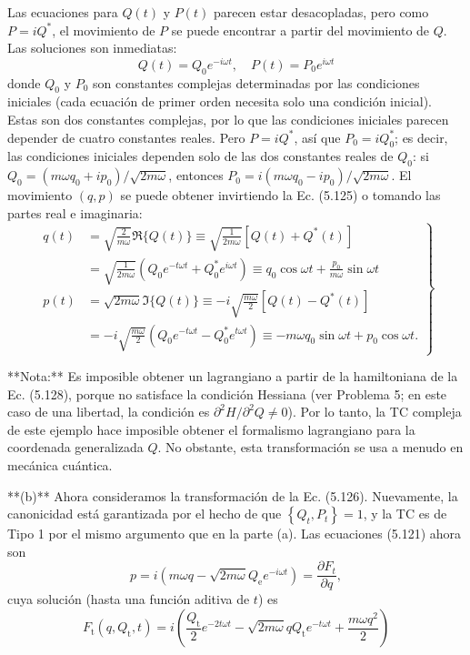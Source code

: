 \begin{example}
Las ecuaciones para $Q(t)$ y $P(t)$ parecen estar desacopladas, pero como $P=i Q^{*}$, el movimiento de $P$ se puede encontrar a partir del movimiento de $Q$. Las soluciones son inmediatas:  
$$
Q(t)=Q_{0} e^{-i \omega t}, \quad P(t)=P_{0} e^{i \omega t} \tag{5.129}
$$  
donde $Q_{0}$ y $P_{0}$ son constantes complejas determinadas por las condiciones iniciales (cada ecuación de primer orden necesita solo una condición inicial). Estas son dos constantes complejas, por lo que las condiciones iniciales parecen depender de cuatro constantes reales. Pero $P=i Q^{*}$, así que $P_{0}=i Q_{0}^{*}$; es decir, las condiciones iniciales dependen solo de las dos constantes reales de $Q_{0}$: si $Q_{0}=\left(m \omega q_{0}+i p_{0}\right) / \sqrt{2 m \omega}$, entonces $P_{0}=i\left(m \omega q_{0}-i p_{0}\right) / \sqrt{2 m \omega}$. El movimiento $(q, p)$ se puede obtener invirtiendo la Ec. (5.125) o tomando las partes real e imaginaria:  
$$
\left.\begin{array}{rl}
q(t) & =\sqrt{\frac{2}{m \omega}} \mathfrak{R}\{Q(t)\} \equiv \sqrt{\frac{1}{2 m \omega}}\left[Q(t)+Q^{*}(t)\right] \\
& =\sqrt{\frac{1}{2 m \omega}}\left(Q_{0} e^{-t \omega t}+Q_{0}^{*} e^{i \omega t}\right) \equiv q_{0} \cos \omega t+\frac{p_{0}}{m \omega} \sin \omega t  \tag{5.130}\\
p(t) & =\sqrt{2 m \omega} \Im\{Q(t)\} \equiv-i \sqrt{\frac{m \omega}{2}}\left[Q(t)-Q^{*}(t)\right] \\
& =-i \sqrt{\frac{m \omega}{2}}\left(Q_{0} e^{-t \omega t}-Q_{0}^{*} e^{t \omega t}\right) \equiv-m \omega q_{0} \sin \omega t+p_{0} \cos \omega t.
\end{array}\right\}
$$  

**Nota:** Es imposible obtener un lagrangiano a partir de la hamiltoniana de la Ec. (5.128), porque no satisface la condición Hessiana (ver Problema 5; en este caso de una libertad, la condición es $\partial^{2} H / \partial^{2} Q \neq 0$). Por lo tanto, la TC compleja de este ejemplo hace imposible obtener el formalismo lagrangiano para la coordenada generalizada $Q$. No obstante, esta transformación se usa a menudo en mecánica cuántica.

**(b)** Ahora consideramos la transformación de la Ec. (5.126). Nuevamente, la canonicidad está garantizada por el hecho de que $\left\{Q_{t}, P_{t}\right\}=1$, y la TC es de Tipo 1 por el mismo argumento que en la parte (a). Las ecuaciones (5.121) ahora son  
$$
p=i\left(m \omega q-\sqrt{2 m \omega} Q_{\mathrm{e}} e^{-i \omega t}\right)=\frac{\partial F_{t}}{\partial q},
$$  
cuya solución (hasta una función aditiva de $t$) es  
$$
F_{\mathrm{t}}\left(q, Q_{\mathrm{t}}, t\right)=i\left(\frac{Q_{\mathrm{t}}}{2} e^{-2 t \omega t}-\sqrt{2 m \omega} q Q_{\mathrm{t}} e^{-t \omega t}+\frac{m \omega q^{2}}{2}\right) \tag{5.131}
$$  


\end{example}
